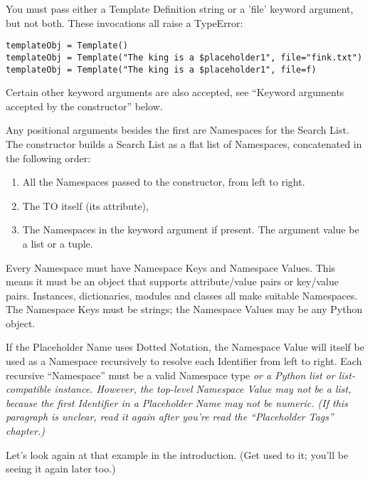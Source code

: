 You must pass either a Template Definition string or a 'file' keyword argument,
but not both.  These invocations all raise a TypeError:

\begin{verbatim}
templateObj = Template() 
templateObj = Template("The king is a $placeholder1", file="fink.txt")
templateObj = Template("The king is a $placeholder1", file=f)
\end{verbatim}

Certain other keyword arguments are also accepted, see 
``Keyword arguments accepted by the constructor'' below.
     
Any positional arguments besides the first are Namespaces for the Search List.
The constructor builds a Search List as a flat list of Namespaces,
concatenated in the following order:

\begin{enumerate}

\item  All the Namespaces passed to the constructor, from left to right.

\item  The TO itself (its  attribute), 

\item  The Namespaces in the keyword argument  if present.  
     The argument value be a list or a tuple.

\end{enumerate}


Every Namespace must have Namespace Keys and Namespace Values.  This means it
must be an object that supports attribute/value pairs or key/value pairs.  
Instances, dictionaries, modules and classes all make suitable Namespaces.
The Namespace Keys must be strings; the Namespace Values may be any Python
object.

If the Placeholder Name uses Dotted Notation, the Namespace Value will itself
be used as a Namespace recursively to resolve each Identifier from left to 
right.  Each recursive ``Namespace'' must be a valid Namespace type 
\em{or} a Python list or list-compatible instance.  However, the top-level
Namespace Value may \em{not} be a list, because the first Identifier in a
Placeholder Name may not be numeric.  (If this paragraph is unclear, read it
again after you're read the ``Placeholder Tags'' chapter.)

Let's look again at that example in the introduction.  (Get used to it; you'll
be seeing it again later too.)

